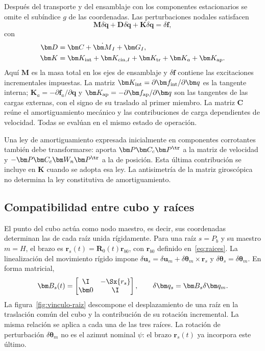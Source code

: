 Después del transporte y del ensamblaje con los componentes estacionarios se omite el subíndice $g$ de las coordenadas. Las perturbaciones nodales satisfacen
\begin{equation}
\bm M\delta\ddot{\bm q}+\bm D\delta\dot{\bm q}
+\bm K\delta\bm q=\delta\bm f,
\label{eq:fullsystem}
\end{equation}
con
\begin{align}
\bm D&=\bm C+\dot{\bm M}_I+\bm G_I,\nonumber\\
\bm K&=\bm K_{\rm int}+\bm K_{{\rm cin},I}
+\bm K_{\rm tr}+\bm K_a+\bm K_{\rm ap}.
\end{align}
Aquí $\bm M$ es la masa total en los ejes de ensamblaje y $\delta\bm f$ contiene las excitaciones incrementales impuestas. La matriz $\bm K_{\rm int}=\partial\bm f_{\rm int}/\partial\bm q$ es la tangente interna; $\bm K_a=-\partial\bm f_a/\partial\bm q$ y $\bm K_{\rm ap}=-\partial\bm f_{\rm ap}/\partial\bm q$ son las tangentes de las cargas externas, con el signo de su traslado al primer miembro. La matriz $\bm C$ reúne el amortiguamiento mecánico y las contribuciones de carga dependientes de velocidad. Todas se evalúan en el mismo estado de operación.

Una ley de amortiguamiento expresada inicialmente en componentes corrotantes también debe transformarse: aporta $\bm P\bm C_c\bm P^\tr$ a la matriz de velocidad y $-\bm P\bm C_c\bm W_n\bm P^\tr$ a la de posición. Esta última contribución se incluye en $\bm K$ cuando se adopta esa ley. La antisimetría de la matriz giroscópica no determina la ley constitutiva de amortiguamiento.

\subsection{Compatibilidad entre cubo y raíces}
El punto del cubo actúa como nodo maestro, es decir, sus coordenadas determinan las de cada raíz unida rígidamente. Para una raíz $s=P_b$ y su maestro $m=H$, el brazo es $\bm r_s(t)=\bm R_0(t)\bm r_{b0}$, con $\bm r_{b0}$ definido en~\eqref{eq:raices}. La linealización del movimiento rígido impone $\delta\bm u_s=\delta\bm u_m+\delta\bm\theta_m\times\bm r_s$ y $\delta\bm\theta_s=\delta\bm\theta_m$. En forma matricial,
\begin{equation}
\bm B_s(t)=\begin{bmatrix}\I&-\Sx{r_s}\\\bm0&\I\end{bmatrix},
\qquad \delta\bm q_s=\bm B_s\delta\bm q_m.
\label{eq:vinculo-raiz}
\end{equation}
La figura~\ref{fig:vinculo-raiz} descompone el desplazamiento de una raíz en la traslación común del cubo y la contribución de su rotación incremental. La misma relación se aplica a cada una de las tres raíces. La rotación de perturbación $\delta\bm\theta_m$ no es el azimut nominal $\psi$: el brazo $\bm r_s(t)$ ya incorpora este último.


